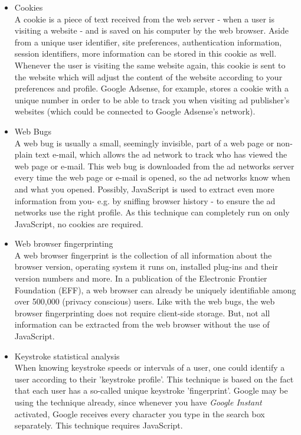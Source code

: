 \documentclass[11pt]{article}
\begin{document}
\begin{itemize}
	\item Cookies\\
		A cookie is a piece of text received from the web server - when a user is visiting a website - and is saved on his computer by the web browser. Aside from a unique user identifier, site preferences, authentication information, session identifiers, more information can be stored in this cookie as well. Whenever the user is visiting the same website again, this cookie is sent to the website which will adjust the content of the website according to your preferences and profile. Google Adsense, for example, stores a cookie with a unique number in order to be able to track you when visiting ad publisher's websites (which could be connected to Google Adsense's network). \cite{Adsense2011}

	\item Web Bugs\\
		A web bug is usually a small, seemingly invisible, part of a web page or non-plain text e-mail, which allows the ad network to track who has viewed the web page or e-mail. This web bug is downloaded from the ad networks server every time the web page or e-mail is opened, so the ad networks know when and what you opened. Possibly, JavaScript is used to extract even more information from you- e.g. by sniffing browser history - to ensure the ad networks use the right profile. As this technique can completely run on only JavaScript, no cookies are required.

	\item Web browser fingerprinting\\
		A web browser fingerprint is the collection of all information about the browser version, operating system it runs on, installed plug-ins and their version numbers and more. In a publication of the Electronic Frontier Foundation (EFF), a web browser can already be uniquely identifiable among over 500,000 (privacy conscious) users. \cite{EFF2010} Like with the web bugs, the web browser fingerprinting does not require client-side storage. But, not all information can be extracted from the web browser without the use of JavaScript.

	\item Keystroke statistical analysis\\
		When knowing keystroke speeds or intervals of a user, one could identify a user according to their 'keystroke profile'. This technique is based on the fact that each user has a so-called unique keystroke 'fingerprint'. Google may be using the technique already, since whenever you have \textit{Google Instant} \cite{GoogleInstant} activated, Google receives every character you type in the search box separately. This technique requires JavaScript. 
\end{itemize}
\end{document}

